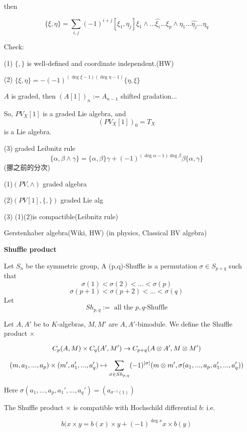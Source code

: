 then

$$\{\xi,\eta\}=\sum_{i,j}(-1)^{i+j}[\xi_1,\eta_j]
\xi_1\wedge...\widehat{\xi_i}...\xi_p\wedge\eta_1...\widehat{\eta_j}...\eta_q$$

Check:

(1) $\{,\}$ is well-defined and coordinate independent.(HW)

(2) $\{\xi,\eta\}=-(-1)^{(\deg\xi-1)(\deg\eta-1)}\{\eta,\xi\}$

\begin{notation}
$A$ is graded, then $(A[1])_n:=A_{n-1}$ shifted gradation...
\end{notation}

So, $PV_X[1]$ is a graded Lie algebra, and
$$(PV_X[1])_0=T_X$$
is a Lie algebra.

(3) graded  Leibnitz rule
$$\{\alpha,\beta\wedge\gamma\}
=\{\alpha,\beta\}\gamma+(-1)^{(\deg\alpha-1)\deg\beta}
\beta\{\alpha,\gamma\}$$
(挪之前的分次)

\begin{prop}

(1)$(PV,\wedge)$ graded algebra

(2)$(PV[1],\{,\})$ graded Lie alg

(3) (1)(2)is compactible(Leibnitz rule)

\end{prop}

Gerstenhaber algebra(Wiki, HW)
(in physics, Classical BV algebra)


\textbf{Shuffle product}

\begin{definition}
Let $S_n$ be the symmetric group, A (p,q)-Shuffle is
 a permutation $\sigma\in S_{p+q}$ such that
 $$\sigma(1)<\sigma(2)<...<\sigma(p)$$
  $$\sigma(p+1)<\sigma(p+2)<...<\sigma(q)$$
Let
$$Sh_{p,q}:=\text{ all the $p,q$-Shuffle}$$
\end{definition}

Let $A,A'$ be to $K$-algebras,
$M,M'$ are $A,A'$-bimodule. We define the Shuffle product $\times$

$$C_p(A,M)\times C_q(A',M')\to C_{p+q}(A\otimes A',M\otimes M')$$

$$(m,a_1,...,a_p)\times(m',a_1',...,a_q')\mapsto
\sum_{\sigma\in Sh_{p,q}}
  (-1)^{|\sigma|}
  (m\otimes m',\sigma(a_1,...,a_p,a_1',...,a_q'))
$$

Here $\sigma(a_1,...,a_p,a_1',...,a_q')=(a_{\sigma^{-1}(1)})$

\begin{prop}
The Shuffle product $\times$ is compatible with
Hochschild differential $b$: i.e.

$$b(x\times y=b(x)\times y+(-1)^{\deg x}x\times b(y)$$
\end{prop}

